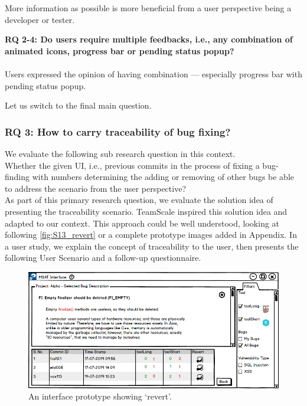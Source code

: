 \begin{myboxi}
	More information as possible is more beneficial from a user perspective being a developer or tester.
\end{myboxi}

\begin{myboxi}{ \textbf{RQ 2-4: Do users require multiple feedbacks, i.e., any combination of animated icons, progress bar or pending status popup?}} 
\\ \\	Users expressed the opinion of having combination — especially progress bar with pending status popup.
\end{myboxi} 
\hfill \break
Let us switch to the final main question. \\

\subsubsection{RQ 3: How to carry traceability of bug fixing?}

We evaluate the following sub research question in this context. \\

Whether the given UI, i.e., previous commits in the process of fixing a bug-finding with numbers determining the adding or removing of other bugs be able to address the scenario from the user perspective? \\

As part of this primary research question, we evaluate the solution idea of presenting the traceability scenario. TeamScale inspired this solution idea and adapted to our context. This approach could be well understood, looking at following \autoref{fig:S13_revert} or a complete prototype images added in Appendix. In a user study, we explain the concept of traceability to the user, then presents the following User Scenario and a follow-up questionnaire. \\

\begin{figure}[hbt!]
	\centering
	\includegraphics[width=\linewidth]{figures/solution_ideas_snaps/S13_revert}
	\caption{An interface prototype showing ‘revert’.}
	\label{fig:S13_revert}
\end{figure}


